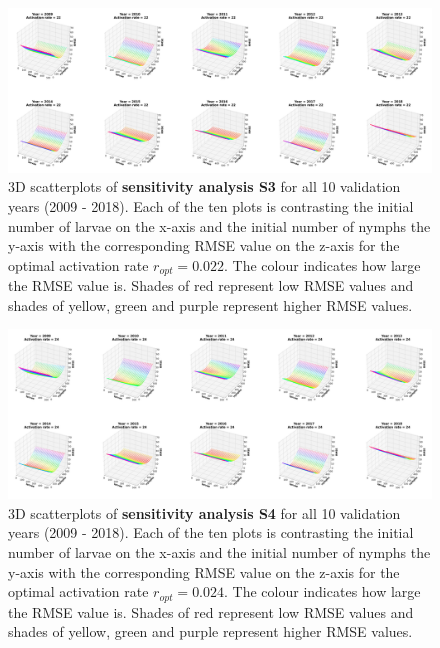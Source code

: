 \documentclass[a4paper, 11pt]{scrartcl}
\begin{document}
\begin{figure}
\centering
\includegraphics[width=\linewidth]{figures/S3_2009_2018_rmse}
\caption{3D scatterplots of \textbf{sensitivity analysis S3} for all 10 validation years (2009 - 2018). Each of the ten plots is contrasting the initial number of larvae on the x-axis and the initial number of nymphs the y-axis with the corresponding RMSE value on the z-axis for the optimal activation rate $r_{opt} = 0.022$. The colour indicates how large the RMSE value is. Shades of red represent low RMSE values and shades of yellow, green and purple represent higher RMSE values.}
\label{fig:S3_2009_2018_rmse_rotated}
\end{figure}

\begin{figure}
\centering
\includegraphics[width=\linewidth]{figures/S4_2009_2018_rmse}
\caption{3D scatterplots of \textbf{sensitivity analysis S4} for all 10 validation years (2009 - 2018). Each of the ten plots is contrasting the initial number of larvae on the x-axis and the initial number of nymphs the y-axis with the corresponding RMSE value on the z-axis for the optimal activation rate $r_{opt} = 0.024$. The colour indicates how large the RMSE value is. Shades of red represent low RMSE values and shades of yellow, green and purple represent higher RMSE values.}
\label{fig:S4_2009_2018_rmse_rotated}
\end{figure}
\end{document}
